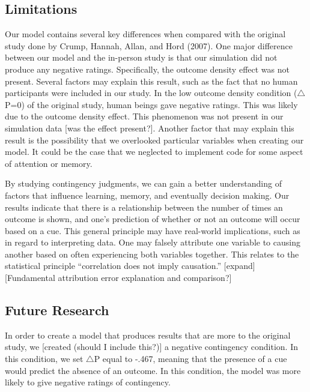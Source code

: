 \documentclass[
  english,
  man,floatsintext]{apa6}
\begin{document}
\hypertarget{limitations}{%
\subsection{Limitations}\label{limitations}}

Our model contains several key differences when compared with the original study done by Crump, Hannah, Allan, and Hord (2007). One major difference between our model and the in-person study is that our simulation did not produce any negative ratings. Specifically, the outcome density effect was not present. Several factors may explain this result, such as the fact that no human participants were included in our study. In the low outcome density condition (\(\triangle\)P=0) of the original study, human beings gave negative ratings. This was likely due to the outcome density effect. This phenomenon was not present in our simulation data {[}was the effect present?{]}. Another factor that may explain this result is the possibility that we overlooked particular variables when creating our model. It could be the case that we neglected to implement code for some aspect of attention or memory.

By studying contingency judgments, we can gain a better understanding of factors that influence learning, memory, and eventually decision making. Our results indicate that there is a relationship between the number of times an outcome is shown, and one's prediction of whether or not an outcome will occur based on a cue. This general principle may have real-world implications, such as in regard to interpreting data. One may falsely attribute one variable to causing another based on often experiencing both variables together. This relates to the statistical principle ``correlation does not imply causation.'' {[}expand{]}
{[}Fundamental attribution error explanation and comparison?{]}

\hypertarget{future-research}{%
\subsection{Future Research}\label{future-research}}

In order to create a model that produces results that are more to the original study, we {[}created (should I include this?){]} a negative contingency condition. In this condition, we set \(\triangle\)P equal to -.467, meaning that the presence of a cue would predict the absence of an outcome. In this condition, the model was more likely to give negative ratings of contingency.
\end{document}
